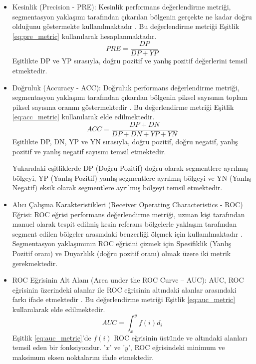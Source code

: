 \begin{itemize}
	\item Kesinlik (Precision - PRE): Kesinlik performans değerlendirme metriği, segmentasyon yaklaşımı tarafından çıkarılan bölgenin gerçekte ne kadar doğru olduğunu göstermekte kullanılmaktadır \cite{altman1994statistics}. Bu değerlendirme metriği Eşitlik \ref{eq:pre_metric} kullanılarak hesaplanmaktadır. 
	{\setlength{\mathindent}{0cm}
	\begin{equation}
		\label{eq:pre_metric}
		PRE=\frac{DP}{DP+YP}
	\end{equation}}
	Eşitlikte DP ve YP sırasıyla, doğru pozitif ve yanlış pozitif değerlerini temsil etmektedir.
	
	\item Doğruluk (Accuracy - ACC): Doğruluk performans değerlendirme metriği, segmentasyon yaklaşımı tarafından çıkarılan bölgenin piksel sayısının toplam piksel sayısına oranını göstermektedir \cite{metz1978basic}. Bu değerlendirme metriği Eşitlik \ref{eq:acc_metric} kullanılarak elde edilmektedir.
	{\setlength{\mathindent}{0cm}
	\begin{equation}
		\label{eq:acc_metric}
		ACC=\frac{DP+DN}{DP+DN+YP+YN}
	\end{equation}}
	Eşitlikte DP, DN, YP ve YN sırasıyla, doğru pozitif, doğru negatif, yanlış pozitif ve yanlış negatif sayısını temsil etmektedir.
	
	Yukarıdaki eşitliklerde DP (Doğru Pozitif) doğru olarak segmentlere ayrılmış bölgeyi, YP (Yanlış Pozitif) yanlış segmentlere ayrılmış bölgeyi ve YN (Yanlış Negatif) eksik olarak segmentlere ayrılmış bölgeyi temsil etmektedir.
	
	\item Alıcı Çalışma Karakteristikleri (Receiver Operating Characteristics - ROC) Eğrisi: ROC eğrisi performans değerlendirme metriği, uzman kişi tarafından manuel olarak tespit edilmiş kesin referans bölgelerle yaklaşım tarafından segment edilen bölgeler arasındaki benzerliği ölçmek için kullanılmaktadır \cite{metz1978basic,fawcett2006introduction}. Segmentasyon yaklaşımının ROC eğrisini çizmek için Spesifiklik (Yanlış Pozitif oranı) ve Duyarlılık (doğru pozitif oranı) olmak üzere iki metrik gerekmektedir.
	
	\item ROC Eğrisinin Alt Alanı (Area under the ROC Curve – AUC): AUC, ROC eğrisinin üzerindeki alanlar ile ROC eğrisinin altındaki alanlar arasındaki farkı ifade etmektedir \cite{hanley1982meaning}. Bu değerlendirme metriği Eşitlik \ref{eq:auc_metric} kullanılarak elde edilmektedir.
	{\setlength{\mathindent}{0cm}
	\begin{equation}
		\label{eq:auc_metric}
		AUC=\int_{x}^{y} f(i) d_{i}
	\end{equation}}
	Eşitlik \ref{eq:auc_metric}'de $f(i)$ ROC eğrisinin üstünde ve altındaki alanları temsil eden bir fonksiyondur. '$x$' ve '$y$', ROC eğrisindeki minimum ve maksimum eksen noktalarını ifade etmektedir.	
\end{itemize}

